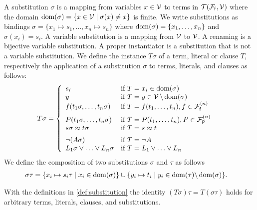 
\begin{definition}\label{def:substitution}
	A {\myem substitution} $\sigma$ is a mapping from variables $x\in{\mathcal V}$ to terms in ${{\mathcal T}({\mathcal F}_{\mathsf f},{\mathcal V})}$
	where the {\myem domain }$\operatorname{dom}(\sigma) = \{ x\in{\mathcal V}\mid\sigma(x) \neq x \}$ is finite.
	We write substitutions as bindings $\sigma=\{ x_1\mapsto s_1,\ldots,x_n\mapsto s_n \}$
	where $\operatorname{dom}(\sigma)=\{ x_1,\ldots,x_n \}$ and $\sigma(x_i)=s_i$.
	A {\myem variable substitution} is a mapping from ${\mathcal V}$ to ${\mathcal V}$.
	A {\myem renaming} is a bijective variable substitution.
	A {\myem proper instantiator} is a substitution that is not a variable substitution.
	We define the instance $T\sigma$ of a term, literal or clause $T$,
	respectively the application of a substitution $\sigma$ to terms, literals, and clauses as follows:
	\begin{align*}
		T\sigma &= \left\{\begin{array}{ll}
			s_i 					& \text{if }T=x_i\in\operatorname{dom}(\sigma)\\
			y					& \text{if }T=y\in{\mathcal V}\,\backslash\operatorname{dom}(\sigma)\\
			f(t_1\sigma,\ldots,t_n\sigma)	&\text{if }T=f(t_1,\ldots,t_n), f\in{{\mathcal F}_{\mathsf f}^{(n)}} \\[0.5em]
			P(t_1\sigma,\ldots,t_n\sigma)	&\text{if }T=P(t_1,\ldots,t_n), P\in{{\mathcal F}_{\mathsf P}^{(n)}} \\
			s\sigma\approx t\sigma			&\text{if }T=s\approx t \\[0.5em]
			\lnot(A\sigma)					&\text{if }T=\lnot A \\
			L_1\sigma\lor\ldots\lor L_n\sigma	&\text{if }T=L_1\lor\ldots\lor L_n \\
		\end{array}\right.	
	\end{align*}
%	
	We define the {\myem composition} of two substitutions $\sigma$ and $\tau$ as follows
	\begin{align*}
		\sigma\tau&=\{ x_i\mapsto s_i\tau\mid x_i\in\operatorname{dom}(\sigma) \}
		\cup
		\{ y_i\mapsto t_i\mid y_i\in\operatorname{dom}(\tau) \backslash \operatorname{dom}(\sigma) \}.
	\end{align*}
	
\end{definition}

\begin{lemma}\label{lem:substitution}
	With the definitions in \ref{def:substitution} the identity
	$(T\sigma)\tau = T(\sigma\tau)$ holds for
	arbitrary terms, literals, clauses, and substitutions.
\end{lemma}